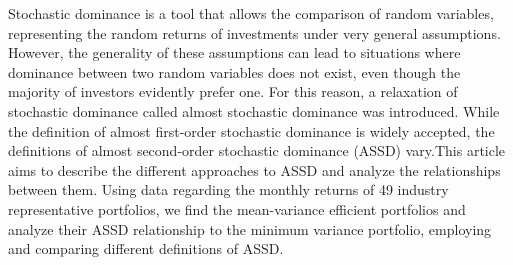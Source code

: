 
\begin{Abstrakt}
    Stochastic dominance is a tool that allows the comparison of random variables, representing the random returns of investments under very general assumptions. However, the generality of these assumptions can lead to situations where dominance between two random variables does not exist, even though the majority of investors evidently prefer one. For this reason, a relaxation of stochastic dominance called almost stochastic dominance was introduced. While the definition of almost first-order stochastic dominance is widely accepted, the definitions of almost second-order stochastic dominance (ASSD) vary.\newline This article aims to describe the different approaches to ASSD and analyze the relationships between them. Using data regarding the monthly returns of 49 industry representative portfolios, we find the mean-variance efficient portfolios and analyze their ASSD relationship to the minimum variance portfolio, employing and comparing different definitions of ASSD.
\end{Abstrakt}



\clearpage